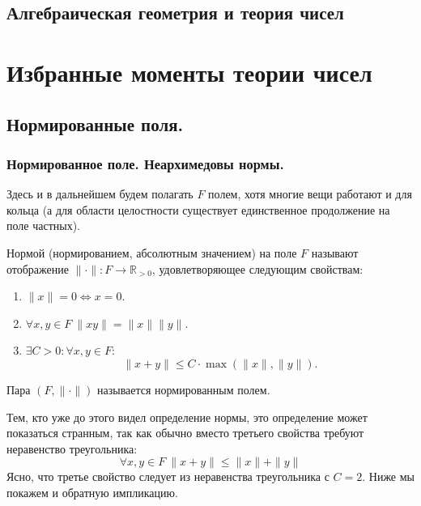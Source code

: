 \documentclass[11pt]{report}
\begin{document}
    
    \begin{center}
        \section*{Алгебраическая геометрия и теория чисел}
    \end{center}
    \tableofcontents
    \newpage
    \chapter{Избранные моменты теории чисел}
    \section{Нормированные поля.}
    \subsection{Нормированное поле. Неархимедовы нормы.}
    Здесь и в дальнейшем будем полагать $F$ полем, хотя многие вещи работают и для кольца (а для области целостности существует
    единственное продолжение на поле частных).

    \begin{definition}\label{fieldnorm}
     Нормой (нормированием, абсолютным значением) на поле $F$  называют отображение $\| \cdot \|\colon F \to \mathbb{R}_{> 0}$,
        удовлетворяющее следующим свойствам:
        \begin{enumerate}
            \item $\| x \| = 0 \Leftrightarrow x = 0$.

            \item $\forall x, y \in F \ \| x y \| = \| x \| \| y \| $.

            \item $\exists C > 0\colon \forall x, y \in F\colon$
            \[ \| x + y \| \le C \cdot \max(\| x \|, \| y \| ). \]
        \end{enumerate}
        Пара $(F, \| \cdot \|)$ называется нормированным полем.
    \end{definition}
    \begin{remark}
        Тем, кто уже до этого видел определение нормы, это определение может показаться странным, так как обычно вместо третьего свойства
        требуют неравенство треугольника:
        \[ \forall x, y \in F \ \| x + y \| \le \| x \| + \| y \| \]
        Ясно, что третье свойство следует из неравенства треугольника с $C = 2$. Ниже мы покажем и обратную импликацию.
    \end{remark}
\end{document}
